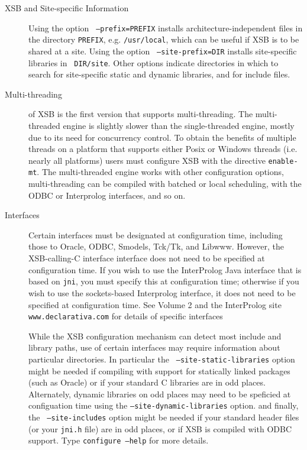 \begin{description}
\item[XSB and Site-specific Information] Using the option {\tt
  --prefix=PREFIX} installs architecture-independent files in the
  directory {\tt PREFIX}, e.g. {\tt /usr/local}, which can be useful
  if XSB is to be shared at a site.  Using the option {\tt
    --site-prefix=DIR} installs site-specific libraries in {\tt
    DIR/site}.  Other options indicate directories in which to search
  for site-specific static and dynamic libraries, and for include
  files.

\item[Multi-threading] \version{} of XSB is the first version that
  supports multi-threading.  The multi-threaded engine is slightly
  slower than the single-threaded engine, mostly due to its need for
  concurrency control.  To obtain the benefits of multiple threads on
  a platform that supports either Posix or Windows threads (i.e.
  nearly all platforms) users must configure XSB with the directive
  {\tt enable-mt}.  The multi-threaded engine works with other
  configuration options, multi-threading can be compiled with batched
  or local scheduling, with the ODBC or Interprolog interfaces, and so
  on.


\item[Interfaces] Certain interfaces must be designated at
configuration time, including those to Oracle, ODBC, Smodels, Tck/Tk,
and Libwww.  However, the XSB-calling-C interface interface does not
need to be specified at configuration time.  If you wish to use the
InterProlog Java interface that is based on {\tt jni}, you must
specify this at configuration time; otherwise if you wish to use the
sockets-based Interprolog interface, it does not need to be specified
at configuration time.  See Volume 2 and the InterProlog site {\tt
www.declarativa.com} for details of specific interfaces

While the XSB configuration mechanism can detect most include and
library paths, use of certain interfaces may require information about
particular directories.  In particular the {\tt
--site-static-libraries} option might be needed if compiling with
support for statically linked packages (such as Oracle) or if your
standard C libraries are in odd places. Alternately, dynamic libraries
on odd places may need to be speficied at configuation time using the
{\tt --site-dynamic-libraries} option.  and finally, the {\tt
--site-includes} option might be needed if your standard header files
(or your {\tt jni.h} file) are in odd places, or if XSB is compiled
with ODBC support.  Type {\tt configure --help} for more details.


\end{description}
